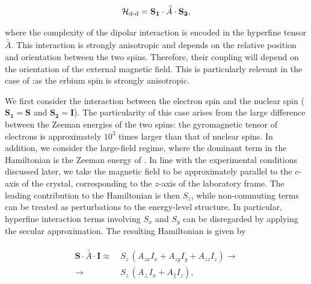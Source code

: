 \begin{equation}
    \mathcal{H}_{\text{d-d}} = \mathbf{S_1} \cdot \bar{\bar {A}} \cdot \mathbf{S_2},
\end{equation}

\noindent where the complexity of the dipolar interaction is encoded in the hyperfine tensor $\bar{\bar{A}}$. This interaction is strongly anisotropic and depends on the relative position and orientation between the two spins. Therefore, their coupling will depend on the orientation of the external magnetic field. This is particularly relevant in the case of \Er:\Ca as the erbium spin is strongly anisotropic. 

We first consider the interaction between the \Er electron spin and the \W nuclear spin ($\mathbf{S_1}=\mathbf{S}$ and $\mathbf{S_2}=\mathbf{I}$). The particularity of this case arises from the large difference between the Zeeman energies of the two spins: the gyromagnetic tensor of electrons is approximately $10^3$ times larger than that of nuclear spins. In addition, we consider the large-field regime, where the dominant term in the Hamiltonian is the Zeeman energy of \Er. In line with the experimental conditions discussed later, we take the magnetic field to be approximately parallel to the $c$-axis of the crystal, corresponding to the $z$-axis of the laboratory frame. The leading contribution to the Hamiltonian is then $S_z$, while non-commuting terms can be treated as perturbations to the energy-level structure. In particular, hyperfine interaction terms involving $S_x$ and $S_y$ can be disregarded by applying the secular approximation. The resulting Hamiltonian is given by

\begin{align}
\begin{split}
    \mathbf{S}\cdot\bar{\bar{A}}\cdot\mathbf{I} \approx&\ S_z\,\left(A_{zx}I_x+A_{zy}I_y+A_{zz}I_z\right) \rightarrow \\
    \rightarrow &\ S_z \, \left(A_\perp I_x + A_\parallel I_z\right),
\end{split}
\end{align}

